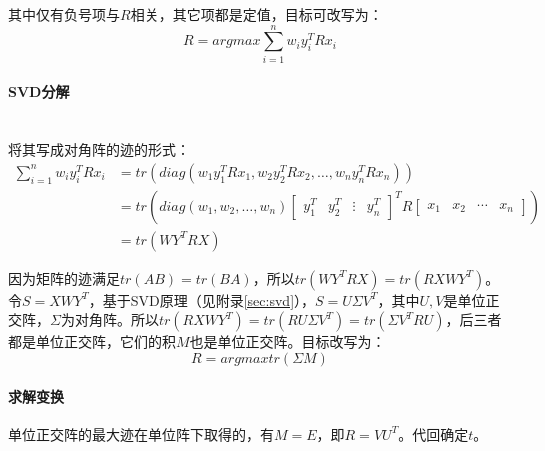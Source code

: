 \documentclass[
12pt, %
a4paper, 
oneside, %
headinclude,footinclude, %
]{scrartcl}
\begin{document}
其中仅有负号项与$ R $相关，其它项都是定值，目标可改写为：
$$ R = argmax \sum_{i = 1}^{n}w_i y_i^T R x_i $$
\paragraph{SVD分解}\label{sec:svd back}~\\

将其写成对角阵的迹的形式：
\begin{align*}
\sum_{i = 1}^{n} w_i y_i^T R x_i 
&= tr(diag(w_1 y_1^T R x_1, w_2 y_2^T R x_2, \dots, w_n y_n^T R x_n)) \\
&= tr(diag(w_1, w_2, \dots, w_n) \begin{bmatrix} y_1^T & y_2^T & \vdots & y_n^T \end{bmatrix}^T R \begin{bmatrix} x_1 & x_2 & \cdots & x_n \end{bmatrix}) \\
&= tr(WY^TRX)
\end{align*}

因为矩阵的迹满足$ tr(AB) = tr(BA) $，所以$ tr(WY^TRX) = tr(RXWY^T) $。令$ S = XWY^T $，基于SVD原理（见附录\ref{sec:svd}），$ S = U \Sigma V^T $，其中$ U,V $是单位正交阵，$ \Sigma $为对角阵。所以$ tr(RXWY^T) = tr(RU \Sigma V^T) = tr(\Sigma V^TRU) $，后三者都是单位正交阵，它们的积$ M $也是单位正交阵。目标改写为：
$$ R = argmax tr(\Sigma M) $$
\paragraph{求解变换}
单位正交阵的最大迹在单位阵下取得的，有$ M = E $，即$ R = VU^T $。代回确定$ t $。
\end{document}
